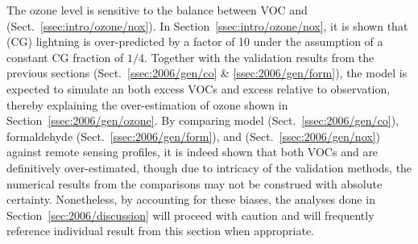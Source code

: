 \noindent The ozone level is sensitive to the balance between VOC and  (Sect.~\ref{ssec:intro/ozone/nox}). In
Section~\ref{ssec:intro/ozone/nox}, it is shown that (CG) lightning is over-predicted by a factor of 10 under the assumption of a constant
CG fraction of $1/4$. Together with the validation results from the previous sections (Sect.~\ref{ssec:2006/gen/co} \& \ref{ssec:2006/gen/form}),
the model is expected to simulate an both excess VOCs and excess  relative to observation, thereby explaining the
over-estimation of ozone shown in Section~\ref{ssec:2006/gen/ozone}. By comparing model  (Sect.~\ref{ssec:2006/gen/co}),
formaldehyde (Sect.~\ref{ssec:2006/gen/form}), and  (Sect.~\ref{ssec:2006/gen/nox}) against remote sensing profiles, it is
indeed shown that both VOCs and  are definitively over-estimated, though due to intricacy of the validation methods, the
numerical results from the comparisons may not be construed with absolute certainty. Nonetheless,  by accounting for these biases, the
analyses done in Section~\ref{sec:2006/discussion} will proceed with caution and will frequently reference individual result from this
section when appropriate.
